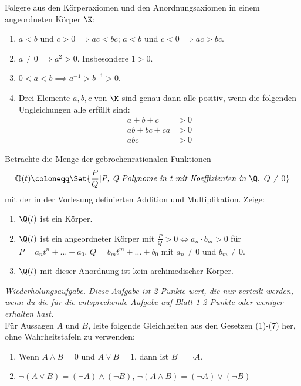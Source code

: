\begin{prob}
  Folgere aus den Körperaxiomen und den Anordnungsaxiomen in einem angeordneten
  Körper $\K$:
  \begin{enumerate}[label=(\alph*)]
  \item $a < b$ und $c > 0 \implies ac < bc$; $a < b$ und
    $c < 0 \implies ac > bc$.
  \item $a \neq 0 \implies a^2 > 0$. Insbesondere $1 > 0$.
  \item $0 < a < b \implies a^{-1} > b^{-1} >0$.
  \item Drei Elemente $a, b, c$ von $\K$ sind genau dann alle positiv, wenn die
    folgenden Ungleichungen alle erfüllt sind:
    \begin{equation*}
      \begin{split}
        a + b + c    & > 0 \\
        ab + bc + ca & > 0 \\
        abc          & > 0
      \end{split}
    \end{equation*}
  \end{enumerate}
\end{prob}

\begin{prob}
  Betrachte die Menge der gebrochenrationalen Funktionen
  \begin{equation*}
    \mathbb{Q}(t)
    \coloneqq
    \Set{\frac{P}{Q} | \textit{P, Q Polynome in t mit Koeffizienten in } \Q, \ Q
      \neq 0}
  \end{equation*}
  mit der in der Vorlesung definierten Addition und Multiplikation. Zeige:
  \begin{enumerate}[label=(\alph*)]
  \item $\Q(t)$ ist ein Körper.
  \item $\Q(t)$ ist ein angeordneter Körper mit
    $\frac{P}{Q}>0 \iff a_n\cdot b_m>0$ für $P = a_nt^n + \ldots + a_0$,
    $Q = b_mt^m + \ldots + b_0$ mit $a_n \neq 0$ und $b_m \neq 0$.
  \item $\Q(t)$ mit dieser Anordnung ist kein archimedischer Körper.
  \end{enumerate}
\end{prob}

\begin{prob}
  \textit{Wiederholungsaufgabe. Diese Aufgabe ist 2 Punkte wert, die nur
    verteilt werden, wenn du die für die entsprechende Aufgabe auf Blatt 1 2
    Punkte oder weniger erhalten hast.} \\
  Für Aussagen $A$ und $B$, leite folgende Gleichheiten aus den Gesetzen (1)-(7)
  her, ohne Wahrheitstafeln zu verwenden:
  \begin{enumerate}
  \item Wenn $A \land B = 0$ und $A \lor B = 1$, dann ist $B = \neg A$.
  \item $\neg (A \lor B) = (\neg A) \land (\neg B)$, $\neg (A \land B) = (\neg
    A) \lor (\neg B)$
  \end{enumerate}
\end{prob}
